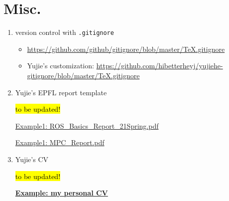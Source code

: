 \section{Misc.}

\begin{enumerate}
    \item version control with \texttt{.gitignore}
    
    \begin{itemize}
        \item \url{https://github.com/github/gitignore/blob/master/TeX.gitignore}
        \item Yujie's customization: \url{https://github.com/hibetterheyj/yujiehe-gitignore/blob/master/TeX.gitignore}
    \end{itemize}
    
    \item Yujie's EPFL report template
    
    \hl{to be updated!}
    
    \href{https://github.com/hibetterheyj/EPFL_ROS_Practicals_Project/blob/master/ROS_Basics_Report_21Spring.pdf}{Example1: ROS\_Basics\_Report\_21Spring.pdf}
    
    \href{https://github.com/hibetterheyj/Model-Predictive-Control-Course-Project/blob/master/MPC_Report.pdf}{Example1: MPC\_Report.pdf}
    
    \item Yujie's CV
    
    \hl{to be updated!}
    
    \href{https://yujie-he.github.io/files/Yujie_HE_Resume.pdf}{\textbf{Example: my personal CV}}
    
    
\end{enumerate}